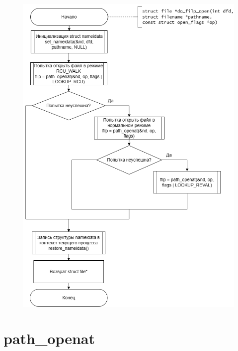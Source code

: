 \documentclass[12pt]{report}
\begin{document}
	\begin{figure}[H]
		\centering		
		\includegraphics[scale=0.6]{do_filp_open}
	\end{figure}
	

	\section{path\_openat}
	
\end{document}
